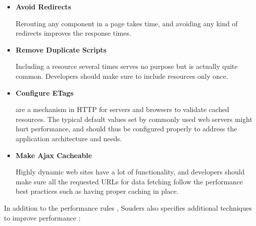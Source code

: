 \begin{itemize}
\item \textbf{Avoid Redirects}

  Rerouting any component in a page takes time, and avoiding any kind
  of redirects improves the response times.

\item \textbf{Remove Duplicate Scripts}

  Including a resource several times serves no purpose but is actually
  quite common. Developers should make sure to include resources only
  once.

\item \textbf{Configure ETags}

   are a mechanism in HTTP for servers and browsers to
  validate cached resources. The typical default values set by
  commonly used web servers might hurt performance, and should thus be
  configured properly to address the application architecture and
  needs.

\item \textbf{Make Ajax Cacheable}

  Highly dynamic web sites have a lot of 
  \cite{garrett2005ajax} functionality, and developers should make
  sure all the requested URLs for data fetching follow the performance
  best practices such as having proper caching in place.

\end{itemize}

In addition to the performance rules \cite{souders2007high}, Souders
also specifies additional techniques to improve performance
\cite{souders2009even}:


